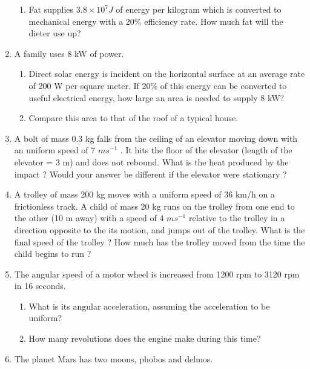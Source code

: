 \begin{enumerate}[label=\arabic*.,ref=\thesection.\theenumi]
\begin{enumerate}[label=(\alph*)]
\item  Fat supplies $3.8 \times 10^7J$ of energy per kilogram which is converted to mechanical energy with a 20\% efficiency rate. How much fat will the dieter use up?
\end{enumerate}
\item A family uses 8 kW of power. 
\begin{enumerate}[label=(\alph*)]
\item  Direct solar energy is incident on the horizontal surface at an average rate of 200 W per square meter. If 20\% of this energy can be converted to useful electrical energy, how large an area is needed to supply 8 kW? 
\item  Compare this area to that of the roof of a typical house.
\end{enumerate}
\item A bolt of mass 0.3 kg falls from the ceiling of an elevator moving down with an uniform speed of 7 $m s^{-1}$
. It hits the floor of the elevator (length of the elevator = 3 m) and does
not rebound. What is the heat produced by the impact ? Would your answer be different if the elevator were stationary ?
\item  A trolley of mass 200 kg moves with a uniform speed of 36 km/h on a frictionless track. A child of mass 20 kg runs on the trolley from one end to the other (10 m away) with a speed of 4 $m s^{-1}$
relative to the trolley in a direction opposite to the its motion, and
jumps out of the trolley. What is the final speed of the trolley ? How much has the trolley moved from the time the child begins to run ?
\item The angular speed of a motor wheel is increased from 1200 rpm to 3120 rpm in 16 seconds. 
\begin{enumerate}[label=(\alph*)]
\item  What is its angular acceleration, assuming the acceleration to be uniform? 
\item  How many revolutions does the engine make during this time?
\end{enumerate}
\item The planet Mars has two moons, phobos and delmos. 
\begin{enumerate}[label=(\alph*)]


\end{enumerate}
\end{enumerate}
